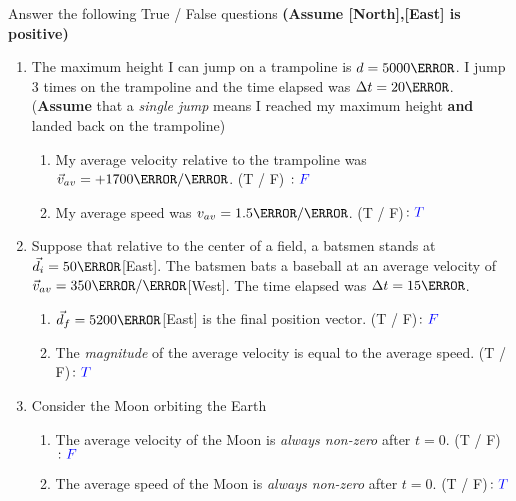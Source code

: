 \documentclass[12pt]{article} %
\begin{document}
\begin{qstn}[1]
	Answer the following True / False questions \textbf{(Assume [North],[East] is positive)}
	\begin{enumerate}
		\item The maximum height I can jump on a trampoline is $d = 5000\m$. I jump $3$ times on the trampoline and the time elapsed was $\Delta t = 20\s$. (\textbf{Assume} that a \emph{single jump} means I reached my maximum height \textbf{and} landed back on the trampoline)
			\begin{enumerate}[label = (\alph*)]
				\item My average velocity relative to the trampoline was $\vec v_{av} = +1700 \m / \s$. (T / F) $\colon \textcolor{blue}{F}$
				\item My average speed was $v_{av} = 1.5 \km / \s$. (T / F)$\colon \textcolor{blue}{T}$
			\end{enumerate}


		\item Suppose that relative to the center of a field, a batsmen stands at $\vec d_i = 50\m$[East]. The batsmen bats a baseball at an average velocity of $\vec v_{av} = 350 \m / \s$[West]. The time elapsed was $\Delta t = 15\s$.
			\begin{enumerate}[label = (\alph*)]
				\item $\vec d_f = 5200 \m$[East] is the final position vector. (T / F)$\colon \textcolor{blue}{F}$
				\item The \emph{magnitude} of the average velocity is equal to the average speed. (T / F)$\colon \textcolor{blue}{T}$
			\end{enumerate}


		\item Consider the Moon orbiting the Earth
			\begin{enumerate}[label = (\alph*)]
				\item The average velocity of the Moon is \emph{always non-zero} after $t = 0$. (T / F)$\colon \textcolor{blue}{F}$
				\item The average speed of the Moon is \emph{always non-zero} after $t = 0$. (T / F)$\colon \textcolor{blue}{T}$
			\end{enumerate}
		

\end{enumerate}
\end{qstn}
\end{document}
